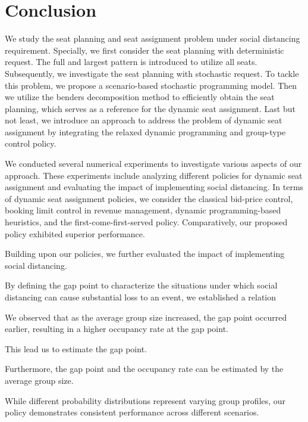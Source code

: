 \section{Conclusion}\label{sec_conclusion}
We study the seat planning and seat assignment problem under social distancing requirement. 
Specially, we first consider the seat planning with deterministic request. The full and largest pattern is introduced to utilize all seats. Subsequently, we investigate the seat planning with stochastic request. To tackle this problem, we propose a scenario-based stochastic programming model. 
Then we utilize the benders decomposition method to efficiently obtain the seat planning, which serves as a reference for the dynamic seat assignment. Last but not least, we introduce an approach to address the problem of dynamic seat assignment by integrating the relaxed dynamic programming and group-type control policy.


We conducted several numerical experiments to investigate various aspects of our approach. These experiments include analyzing different policies for dynamic seat assignment and evaluating the impact of implementing social distancing. In terms of dynamic seat assignment policies, we consider the classical bid-price control, booking limit control in revenue management, dynamic programming-based heuristics, and the first-come-first-served policy. Comparatively, our proposed policy exhibited superior performance.

Building upon our policies, we further evaluated the impact of implementing social distancing. 

By defining the gap point to characterize the situations under which social distancing
can cause substantial loss to an event, we established a relation 

We observed that as the average group size increased, the gap point occurred earlier, resulting in a higher occupancy rate at the gap point. 

This lead us to estimate the gap point.

Furthermore, the gap point and the occupancy rate can be estimated by the average group size.

While different probability distributions represent varying group profiles, our policy demonstrates consistent performance across different scenarios. 

